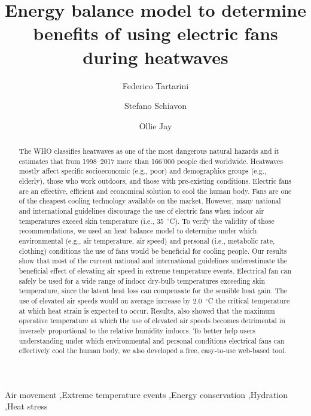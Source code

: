 
\begin{frontmatter}

\title{Energy balance model to determine benefits of using electric fans during heatwaves}

\author[sinBerBest]{Federico Tartarini}
\author[CBE]{Stefano Schiavon}
\author[USYD]{Ollie Jay}

\address[sinBerBest]{SinBerBEST, Berkeley Education Alliance for Research in Singapore, Singapore}
\address[CBE]{Center for the Built Environment, University of California, Berkeley, USA}
\address[USYD]{Sydney School ofHealth Sciences, Faculty ofMedicine and Health, The University ofSydney, Sydney, Australia}

\begin{abstract}
    The WHO classifies heatwaves as one of the most dangerous natural hazards and it estimates that from 1998--2017 more than 166'000 people died worldwide.
    Heatwaves mostly affect specific socioeconomic (e.g., poor) and demographics groups (e.g., elderly), those who work outdoors, and those with pre-existing conditions.
    Electric fans are an effective, efficient and economical solution to cool the human body.
    Fans are one of the cheapest cooling technology available on the market.
    However, many national and international guidelines discourage the use of electric fans when indoor air temperatures exceed skin temperature (i.e., 35~$^{\circ}$C).
    To verify the validity of those recommendations, we used an heat balance model to determine under which environmental (e.g., air temperature, air speed) and personal (i.e., metabolic rate, clothing) conditions the use of fans would be beneficial for cooling people.
    Our results show that most of the current national and international guidelines underestimate the beneficial effect of elevating air speed in extreme temperature events.
    Electrical fan can safely be used for a wide range of indoor dry-bulb temperatures exceeding skin temperature, since the latent heat loss can compensate for the sensible heat gain.
    The use of elevated air speeds would on average increase by 2.0~$^{\circ}$C the critical temperature at which heat strain is expected to occur.
    Results, also showed that the maximum operative temperature at which the use of elevated air speeds becomes detrimental in inversely proportional to the relative humidity indoors.
    To better help users understanding under which environmental and personal conditions electrical fans can effectively cool the human body, we also developed a free, easy-to-use web-based tool.
\end{abstract}

\begin{keyword}
Air movement \sep Extreme temperature events \sep Energy conservation \sep Hydration \sep Heat stress
\end{keyword}

\end{frontmatter}
